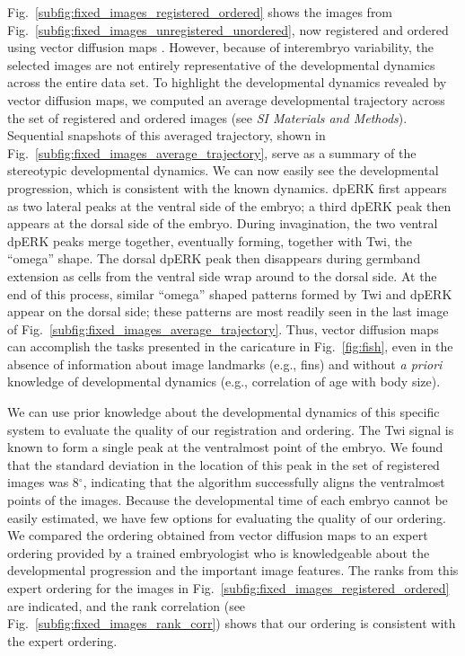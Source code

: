 \documentclass{pnastwo}
\newcommand{\SI}[0]{{\it SI Materials and Methods}}
\newcommand{\fig}[0]{Fig.}
\begin{document}
\begin{article}
\fig~\ref{subfig:fixed_images_registered_ordered} shows the images from \fig~\ref{subfig:fixed_images_unregistered_unordered}, now registered and ordered using vector diffusion maps \cite{singer2012vector}.
%
However, because of interembryo variability, the selected images are not entirely representative of the developmental dynamics across the entire data set.
%
To highlight the developmental dynamics revealed by vector diffusion maps, we computed an average developmental trajectory across the set of registered and ordered images (see \SI). 
%
Sequential snapshots of this averaged trajectory, shown in \fig~\ref{subfig:fixed_images_average_trajectory}, serve as a summary of the stereotypic developmental dynamics.
%
We can now easily see the developmental progression, which is consistent with the known dynamics. 
%
dpERK first appears as two lateral peaks at the ventral side of the embryo; a third dpERK peak then appears at the dorsal side of the embryo.
%
During invagination, the two ventral dpERK peaks merge together, eventually forming, together with Twi, the ``omega'' shape.
%
The dorsal dpERK peak then disappears during germband extension as cells from the ventral side wrap around to the dorsal side.
%
At the end of this process, similar ``omega'' shaped patterns formed by Twi and dpERK appear on the dorsal side; these patterns are most readily seen in the last image of \fig~\ref{subfig:fixed_images_average_trajectory}.
%
Thus, vector diffusion maps can accomplish the tasks presented in the caricature in \fig~\ref{fig:fish}, even in the absence of information about image landmarks (e.g., fins) and without {\it a priori} knowledge of developmental dynamics (e.g., correlation of age with body size).

We can use prior knowledge about the developmental dynamics of this specific system to evaluate the quality of our registration and ordering. 
%
The Twi signal is known to form a single peak at the ventralmost point of the embryo. 
%
We found that the standard deviation in the location of this peak in the set of registered images was 8$^\circ$,
indicating that the algorithm successfully aligns the ventralmost points of the images. 
%
Because the developmental time of each embryo cannot be easily estimated, we have few options for evaluating the quality of our ordering. 
%
We compared the ordering obtained from vector diffusion maps to an expert ordering provided by a trained embryologist who is knowledgeable about the developmental progression and the important image features.  
%
The ranks from this expert ordering for the images in \fig~\ref{subfig:fixed_images_registered_ordered} are indicated, and the rank correlation (see \fig~\ref{subfig:fixed_images_rank_corr}) shows that our ordering is consistent with the expert ordering. 


\end{article}
\end{document}
